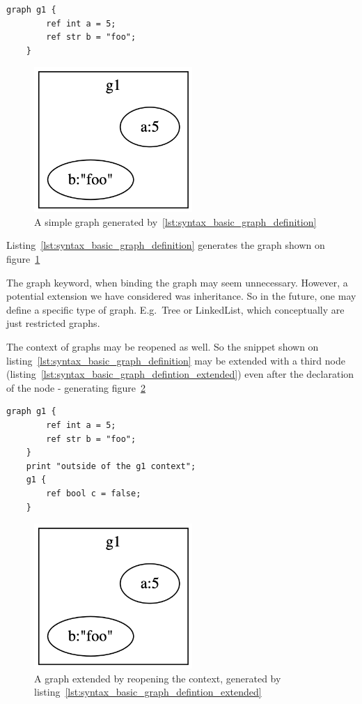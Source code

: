 \begin{lstlisting}[caption={Graph declaration.}, captionpos=b, label={lst:syntax_basic_graph_definition}]
    graph g1 {
        ref int a = 5;
        ref str b = "foo";
    }
\end{lstlisting}

\begin{figure}[H]
    \centering
    \includegraphics[width=6cm]{figures/syntax_section/syntax_simple_graph}
    \caption{A simple graph generated by~\ref{lst:syntax_basic_graph_definition}}
    \label{fig:syntax_basic_graph}
\end{figure}

Listing~\ref{lst:syntax_basic_graph_definition} generates the graph shown on figure~\ref{fig:syntax_basic_graph}

The graph keyword, when binding the graph may seem unnecessary.
However, a potential extension we have considered was inheritance.
So in the future, one may define a specific type of graph.
E.g.\ Tree or LinkedList, which conceptually are just restricted graphs.

The context of graphs may be reopened as well.
So the snippet shown on listing~\ref{lst:syntax_basic_graph_definition}
may be extended with a third node (listing~\ref{lst:syntax_basic_graph_defintion_extended})
even after the declaration of the node - generating figure~\ref{fig:syntax_basic_graph_extended}

\begin{lstlisting}[caption={Extending a graph.},captionpos=b,label={lst:syntax_basic_graph_defintion_extended}]
    graph g1 {
        ref int a = 5;
        ref str b = "foo";
    }
    print "outside of the g1 context";
    g1 {
        ref bool c = false;
    }
\end{lstlisting}

\begin{figure}[H]
    \centering
    \includegraphics[width=6cm]{figures/syntax_section/syntax_simple_graph}
    \caption{A graph extended by reopening the context, generated by listing~\ref{lst:syntax_basic_graph_defintion_extended}}
    \label{fig:syntax_basic_graph_extended}
\end{figure}

